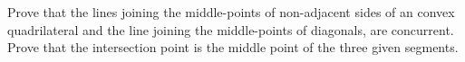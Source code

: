 Prove that the lines joining the middle-points of non-adjacent sides of an convex quadrilateral and the line joining the middle-points of diagonals, are concurrent. Prove that the intersection point is the middle point of the three given segments.